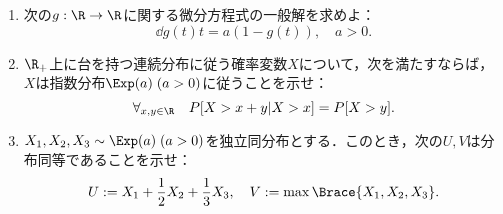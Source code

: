 \documentclass[uplatex,dvipdfmx]{jsarticle}
\begin{document}
\begin{tcolorbox}[colframe=ForestGreen, colback=ForestGreen!10!white,breakable,colbacktitle=ForestGreen!40!white,coltitle=black,fonttitle=\bfseries\sffamily,
    title=第４問]
    \begin{enumerate}
        \item 次の$g:\R\to\R$に関する微分方程式の一般解を求めよ：
        \[\dd{g(t)}{t}=a(1-g(t)),\quad a>0.\]
        \item $\R_+$上に台を持つ連続分布に従う確率変数$X$について，次を満たすならば，$X$は指数分布$\Exp(a)\;(a>0)$に従うことを示せ：
        \[\forall_{x,y\in\R}\quad P[X>x+y|X>x]=P[X>y].\]
        \item $X_1,X_2,X_3\sim\Exp(a)\;(a>0)$を独立同分布とする．このとき，次の$U,V$は分布同等であることを示せ：
        \[U:=X_1+\frac{1}{2}X_2+\frac{1}{3}X_3,\quad V:=\max\Brace{X_1,X_2,X_3}.\]
    \end{enumerate}
\end{tcolorbox}
\end{document}
